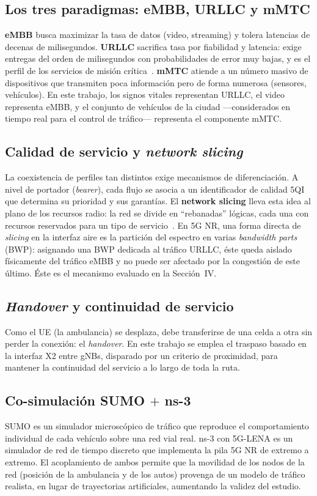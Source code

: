 \documentclass[conference,onecolumn]{IEEEtran}
\begin{document}
\subsection{Los tres paradigmas: eMBB, URLLC y mMTC}
\textbf{eMBB} busca maximizar la tasa de datos (video, streaming) y tolera
latencias de decenas de milisegundos. \textbf{URLLC} sacrifica tasa por
fiabilidad y latencia: exige entregas del orden de milisegundos con
probabilidades de error muy bajas, y es el perfil de los servicios de misión
crítica~\cite{urllc}. \textbf{mMTC} atiende a un número masivo de dispositivos
que transmiten poca información pero de forma numerosa (sensores, vehículos). En
este trabajo, los signos vitales representan URLLC, el video representa eMBB, y
el conjunto de vehículos de la ciudad ---considerados en tiempo real para el
control de tráfico--- representa el componente mMTC.

\subsection{Calidad de servicio y \textit{network slicing}}
La coexistencia de perfiles tan distintos exige mecanismos de diferenciación. A
nivel de portador (\textit{bearer}), cada flujo se asocia a un identificador de
calidad 5QI que determina su prioridad y sus garantías. El \textbf{network
slicing} lleva esta idea al plano de los recursos radio: la red se divide en
``rebanadas'' lógicas, cada una con recursos reservados para un tipo de
servicio~\cite{slicing}. En 5G NR, una forma directa de \textit{slicing} en la
interfaz aire es la partición del espectro en varias \textit{bandwidth parts}
(BWP): asignando una BWP dedicada al tráfico URLLC, éste queda aislado
físicamente del tráfico eMBB y no puede ser afectado por la congestión de este
último. Éste es el mecanismo evaluado en la Sección~IV.

\subsection{\textit{Handover} y continuidad de servicio}
Como el UE (la ambulancia) se desplaza, debe transferirse de una celda a otra
sin perder la conexión: el \textit{handover}. En este trabajo se emplea el
traspaso basado en la interfaz X2 entre gNBs, disparado por un criterio de
proximidad, para mantener la continuidad del servicio a lo largo de toda la
ruta.

\subsection{Co-simulación SUMO $+$ ns-3}
SUMO es un simulador microscópico de tráfico que reproduce el comportamiento
individual de cada vehículo sobre una red vial real. ns-3 con 5G-LENA es un
simulador de red de tiempo discreto que implementa la pila 5G NR de extremo a
extremo. El acoplamiento de ambos permite que la movilidad de los nodos de la
red (posición de la ambulancia y de los autos) provenga de un modelo de tráfico
realista, en lugar de trayectorias artificiales, aumentando la validez del
estudio.
\end{document}
